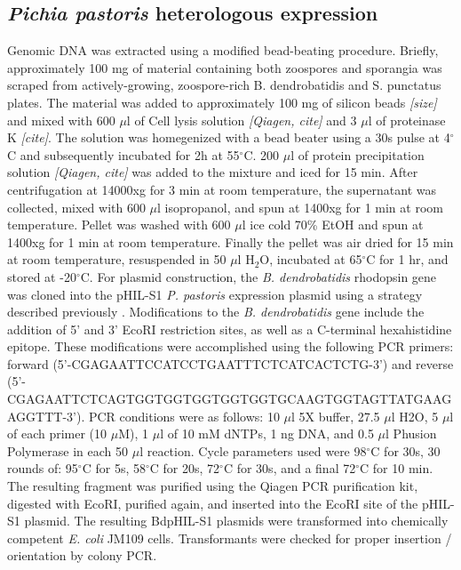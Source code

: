 \subsection*{\textit{Pichia pastoris} heterologous expression}
Genomic DNA was extracted using a modified bead-beating procedure. Briefly, approximately 100 mg of material containing both zoospores and sporangia was scraped from actively-growing, zoospore-rich B. dendrobatidis and S. punctatus plates. The material was added to approximately 100 mg of silicon beads \emph{[size]} and mixed with 600 $\mu$l of Cell lysis solution \emph{[Qiagen, cite]} and 3 $\mu$l of proteinase K \emph{[cite]}. The solution was homegenized with a bead beater using a 30s pulse at 4$^{\circ}$C and subsequently incubated for 2h at 55$^{\circ}$C. 200 $\mu$l of protein precipitation solution \emph{[Qiagen, cite]} was added to the mixture and iced for 15 min. After centrifugation at 14000xg for 3 min at room temperature, the supernatant was collected, mixed with 600 $\mu$l isopropanol, and spun at 1400xg for 1 min at room temperature. Pellet was washed with 600 $\mu$l ice cold 70\% EtOH and spun at 1400xg for 1 min at room temperature. Finally the pellet was air dried for 15 min at room temperature, resuspended in 50 $\mu$l H$_{2}$O, incubated at 65$^{\circ}$C for 1 hr, and stored at -20$^{\circ}$C.
\indent For plasmid construction, the \textit{B. dendrobatidis} rhodopsin gene was cloned into the pHIL-S1 \textit{P. pastoris} expression plasmid using a strategy described previously \cite{Bieszke1999}.  Modifications to the \textit{B. dendrobatidis} gene include the addition of 5' and 3' EcoRI restriction sites, as well as a C-terminal hexahistidine epitope. These modifications were accomplished using the following PCR primers: forward (5'-CGAGAATTCCATCCTGAATTTCTCATCACTCTG-3') and reverse (5'-CGAGAATTCTCAGTGGTGGTGGTGGTGGTGCAAGTGGTAGTTATGAAGAGGTTT-3'). PCR conditions were as follows: 10 $\mu$l 5X buffer, 27.5 $\mu$l H2O, 5 $\mu$l of each primer (10 $\mu$M), 1 $\mu$l of 10 mM dNTPs, 1 ng DNA, and 0.5 $\mu$l Phusion Polymerase in each 50 $\mu$l reaction. Cycle parameters used were 98$^{\circ}$C for 30s, 30 rounds of: 95$^{\circ}$C for 5s, 58$^{\circ}$C for 20s, 72$^{\circ}$C for 30s, and a final 72$^{\circ}$C for 10 min. The resulting fragment was purified using the Qiagen PCR purification kit, digested with EcoRI, purified again, and inserted into the EcoRI site of the pHIL-S1 plasmid. The resulting BdpHIL-S1 plasmids were transformed into chemically competent \textit{E. coli} JM109 cells. Transformants were checked for proper insertion / orientation by colony PCR.\\ 
